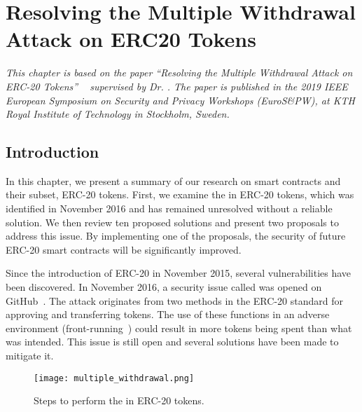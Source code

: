 
\chapter{Resolving the Multiple Withdrawal Attack on ERC20 Tokens}\label{ch:multiple}

\textit{This chapter is based on the paper ``Resolving the Multiple Withdrawal Attack on ERC-20 Tokens'' ~\cite{MultipleWithdrawal} supervised by Dr. \supv. The paper is published in the 2019 IEEE European Symposium on Security and Privacy Workshops (EuroS\&PW), at KTH Royal Institute of Technology in Stockholm, Sweden.}

\section{Introduction}
In this chapter, we present a summary of our research on smart contracts and their subset, ERC-20 tokens. First, we examine the \mwa in ERC-20 tokens, which was identified in November 2016 and has remained unresolved without a reliable solution. We then review ten proposed solutions and present two proposals to address this issue. By implementing one of the proposals, the security of future ERC-20 smart contracts will be significantly improved.

Since the introduction of ERC-20 in November 2015, several vulnerabilities have been discovered. In November 2016, a security issue called \mwa was opened on GitHub~\cite{AttackVector,Resolution}. The attack originates from two methods in the ERC-20 standard for approving and transferring tokens. The use of these functions in an adverse environment (\eg front-running~\cite{eskandari2019sok}) could result in more tokens being spent than what was intended. This issue is still open and several solutions have been made to mitigate it.

\begin{figure}[t]
	\centering
	\texttt{[image: multiple\_withdrawal.png]}
	\caption[Steps for the \mwa in ERC-20 tokens]{Steps to perform the \mwa in ERC-20 tokens.}
	\label{fig:mwa}
\end{figure}

